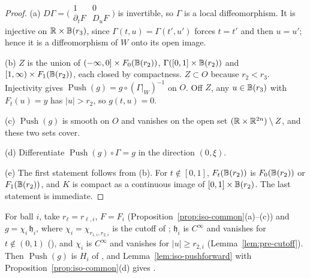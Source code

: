 \begin{proof}
(a) $D\Gamma=\bigl(\begin{smallmatrix}1&0\\\partial_tF&D_uF\end{smallmatrix}\bigr)$ is invertible, so $\Gamma$ is a local diffeomorphism. It is injective on $\mathbb{R}\times\mathbb{B}(r_3)$, since $\Gamma(t,u)=\Gamma(t',u')$ forces $t=t'$ and then $u=u'$; hence it is a diffeomorphism of $W$ onto its open image.

(b) $Z$ is the union of $(-\infty,0]\times F_0(\mathbb{B}(r_2))$, $\Gamma([0,1]\times\mathbb{B}(r_2))$ and $[1,\infty)\times F_1(\mathbb{B}(r_2))$, each closed by compactness. $Z\subset O$ because $r_2<r_3$. Injectivity gives $\operatorname{Push}(g)=g\circ(\Gamma|_W)^{-1}$ on $O$. Off $Z$, any $u\in\mathbb{B}(r_3)$ with $F_t(u)=y$ has $|u|>r_2$, so $g(t,u)=0$.

(c) $\operatorname{Push}(g)$ is smooth on $O$ and vanishes on the open set $(\mathbb{R}\times\mathbb{R}^{2n})\setminus Z$, and these two sets cover.

(d) Differentiate $\operatorname{Push}(g)\circ\Gamma=g$ in the direction $(0,\xi)$.

(e) The first statement follows from (b). For $t\notin[0,1]$, $F_t(\mathbb{B}(r_2))$ is $F_0(\mathbb{B}(r_2))$ or $F_1(\mathbb{B}(r_2))$, and $K$ is compact as a continuous image of $[0,1]\times\mathbb{B}(r_2)$. The last statement is immediate.
\end{proof}

For ball $i$, take $r_\ell=r_{\ell,i}$, $F=F_i$ (Proposition~\ref{prop:iso-common}(a)--(c)) and $g=\chi_i\,\mathfrak h_i$, where $\chi_i=\chi_{r_{1,i},r_{2,i}}$ is the cutoff of ; $\mathfrak h_i$ is $C^\infty$ and vanishes for $t\notin(0,1)$ (), and $\chi_i$ is $C^\infty$ and vanishes for $|u|\ge r_{2,i}$ (Lemma~\ref{lem:pre-cutoff}). Then $\operatorname{Push}(g)$ is $H_i$ of , and Lemma~\ref{lem:iso-pushforward} with Proposition~\ref{prop:iso-common}(d) gives .
